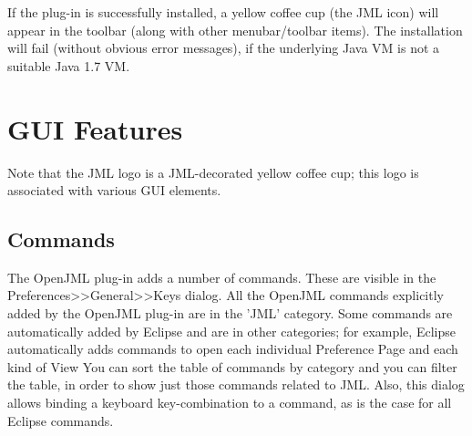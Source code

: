 If the plug-in is successfully installed, a yellow coffee cup (the JML icon) will appear in the toolbar (along with other menubar/toolbar items).
The installation will fail (without obvious error messages), if the underlying Java VM is not a suitable Java 1.7 VM.

\section{GUI Features}

Note that the JML logo is a JML-decorated yellow coffee cup; this logo is associated with various GUI elements.
 
\subsection{Commands}
The OpenJML plug-in adds a number of commands. These are visible in the Preferences>>General>>Keys dialog. All the OpenJML commands explicitly added by the OpenJML plug-in are in the 'JML' category. Some commands are automatically added by Eclipse and are in other categories; for example, Eclipse automatically adds commands to open each individual Preference Page and each kind of View You can sort the table of commands by category and you can filter the table, in order to show just those commands related to JML. Also, this dialog allows binding a keyboard key-combination to a command, as is the case for all Eclipse commands.

